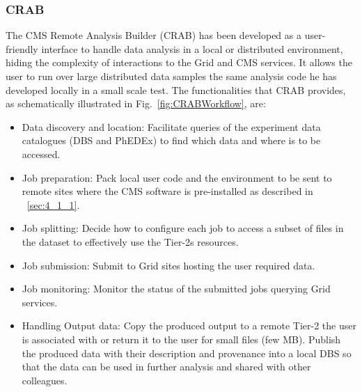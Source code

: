 \subsubsection{CRAB}
The CMS Remote Analysis Builder (CRAB)\cite{RefCRAB} has been developed as a user-friendly interface to handle data analysis in a local or distributed environment, hiding the complexity of interactions to the Grid and CMS services.
It allows the user to run over large distributed data samples the same 
analysis code he has developed locally in a small scale test. 
The functionalities that CRAB provides, as schematically illustrated in Fig.~\ref{fig:CRABWorkflow}, are:
\begin{itemize}
\item{Data discovery and location:}
Facilitate queries of the experiment data catalogues (DBS and PhEDEx) to find which data and where is to be accessed.
\item{Job preparation:}
Pack local user code and the environment to be sent to remote sites where the CMS software is pre-installed as described in ~\ref{sec:4_1_1}.
\item{Job splitting:}
Decide how to configure each job to access a subset of files in the dataset to effectively use the Tier-2s resources.
\item{Job submission:}
Submit to Grid sites hosting the user required data.
\item{Job monitoring:}
Monitor the status of the submitted jobs querying Grid services.
\item{Handling Output data:}
Copy the produced output to a remote Tier-2 the user is associated with or return it to the user for small files (few MB).
Publish the produced data with their description and provenance into a local DBS so that the data can be used in further analysis and shared with other colleagues.
\end{itemize} 

